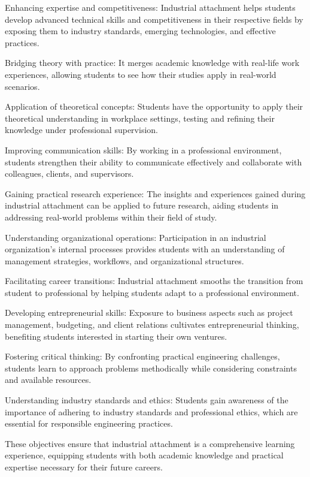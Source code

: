 Enhancing expertise and competitiveness: Industrial attachment helps students develop advanced technical skills and competitiveness in their respective fields by exposing them to industry standards, emerging technologies, and effective practices.

Bridging theory with practice: It merges academic knowledge with real-life work experiences, allowing students to see how their studies apply in real-world scenarios.

Application of theoretical concepts: Students have the opportunity to apply their theoretical understanding in workplace settings, testing and refining their knowledge under professional supervision.

Improving communication skills: By working in a professional environment, students strengthen their ability to communicate effectively and collaborate with colleagues, clients, and supervisors.

Gaining practical research experience: The insights and experiences gained during industrial attachment can be applied to future research, aiding students in addressing real-world problems within their field of study.

Understanding organizational operations: Participation in an industrial organization’s internal processes provides students with an understanding of management strategies, workflows, and organizational structures.

Facilitating career transitions: Industrial attachment smooths the transition from student to professional by helping students adapt to a professional environment.

Developing entrepreneurial skills: Exposure to business aspects such as project management, budgeting, and client relations cultivates entrepreneurial thinking, benefiting students interested in starting their own ventures.

Fostering critical thinking: By confronting practical engineering challenges, students learn to approach problems methodically while considering constraints and available resources.

Understanding industry standards and ethics: Students gain awareness of the importance of adhering to industry standards and professional ethics, which are essential for responsible engineering practices.

These objectives ensure that industrial attachment is a comprehensive learning experience, equipping students with both academic knowledge and practical expertise necessary for their future careers.

